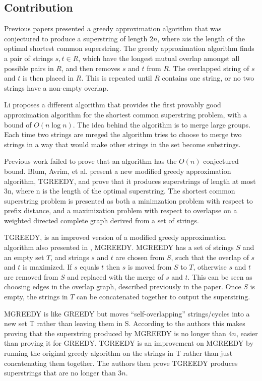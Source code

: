 \documentclass[letterpaper,11pt,titlepage]{article}
\begin{document}
\newpage
\subsection*{Contribution}
Previous papers \cite{tarhio1988greedy} \cite{turner1989approximation} presented a greedy approximation algorithm that was conjectured to produce a superstring of length $2n$, where $n$is the length of the optimal shortest common superstring.  The greedy approximation algorithm finds a pair of strings $s,t \in R$, which have the longest mutual overlap amongst all possible pairs in $R$, and then removes $s$ and $t$ from $R$.  The overlapped string of $s$ and $t$ is then placed in $R$.  This is repeated until $R$ contains one string, or no two strings have a non-empty overlap. \cite{tarhio1988greedy}

Li \cite{li1990towards} proposes a different algorithm that provides the first provably good approximation algorithm for the shortest common superstring problem, with a bound of $O(n\log n)$.  The idea behind the algorithm is to merge large groups.  Each time two strings are mreged the algorithm tries to choose to merge two strings in a way that would make other strings in the set become substrings.  

Previous work failed to prove that an algorithm has the $O(n)$ conjectured bound.  Blum, Avrim, et al. \cite{blum1991linear} present a new modified greedy approximation algorithm, TGREEDY, and prove that it produces superstrings of length at most 3n, where n is the length of the optimal superstring.  The shortest common superstring problem is presented as both a minimzation problem with respect to prefix distance, and a maximization problem with respect to overlapse on a weighted directed complete graph derived from a set of strings. \cite{romero2004experimental}

TGREEDY, is an improved version of a modified greedy approximation algorithm also presented in \cite{blum1991linear}, MGREEDY.  MGREEDY has a set of strings $S$ and an empty set $T$, and strings $s$ and $t$ are chosen from $S$, such that the overlap of $s$ and $t$ is maximized.  If $s$ equals $t$ then $s$ is moved from $S$ to $T$, otherwise $s$ and $t$ are removed from $S$ and replaced with the merge of $s$ and $t$.  This can be seen as choosing edges in the overlap graph, described previously in the paper.  Once $S$ is empty, the strings in $T$ can be concatenated together to output the superstring.

MGREEDY is like GREEDY but moves ``self-overlapping'' strings/cycles into a new set T rather than leaving them in S.  According to the authors this makes proving that the superstring produced by MGREEDY is no longer than $4n$, easier than proving it for GREEDY.  TGREEDY is an improvement on MGREEDY by running the original greedy algorithm on the strings in T rather than just concatenating them together.  The authors then prove TGREEDY produces superstrings that are no longer than $3n$.  
\end{document}
